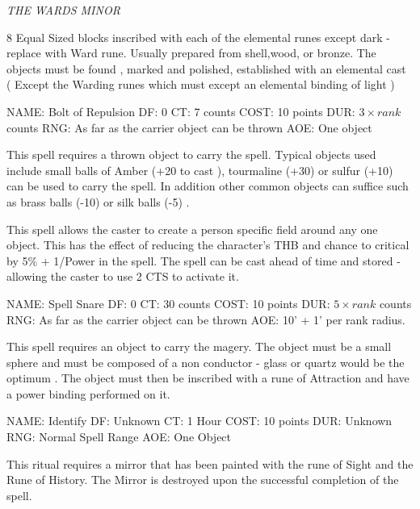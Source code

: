 {\it THE WARDS MINOR}

8 Equal Sized blocks inscribed with each of the elemental
runes except dark - replace with Ward rune. Usually prepared from
shell,wood, or bronze. The objects must be found , marked and
polished, established with an elemental cast ( Except the Warding
runes which must except an elemental binding of light )

\newpage

\spell
NAME: Bolt of Repulsion
DF:  0
CT:  7 counts
COST:  10 points
DUR:  \( 3 \times rank \) counts
RNG:  As far as the carrier object can be thrown
AOE:  One object

\bigskip


This spell requires a thrown object to carry the spell. Typical
objects used include small balls of Amber (+20 to cast ), tourmaline (+30)
or sulfur (+10) can be used to carry the spell. In addition other common
objects can suffice such as brass balls (-10) or silk balls (-5) .


This spell allows the caster to create a person specific field
around any one object. This has the effect of reducing the character's
THB and chance to critical by 5\% + 1/Power in the spell. The spell can
be cast ahead of time and stored - allowing the caster to use 2 CTS to
activate it.

\newpage

\spell
NAME: Spell Snare
DF:  0
CT:  30 counts
COST:  10 points
DUR:  \( 5 \times rank \) counts
RNG:  As far as the carrier object can be thrown
AOE:  10' + 1' per rank radius.

\bigskip
{}

This spell requires an object to carry the magery. The object
must be a small sphere and must be composed of a non conductor -
glass or quartz would be the optimum . The object must then be
inscribed with a rune of Attraction and have a power binding performed
on it.

\newpage

\spell
NAME: Identify
DF:   Unknown
CT:   1 Hour
COST:  10 points
DUR:  Unknown
RNG:  Normal Spell Range
AOE:  One Object

\bigskip


This ritual requires a mirror that has been painted with
the rune of Sight and the Rune of History. The Mirror is destroyed upon
the successful completion of the spell.

